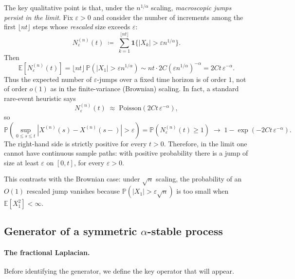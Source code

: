 \documentclass[11pt]{article}
\begin{document}
The key qualitative point is that, under the $n^{1/\alpha}$ scaling, \emph{macroscopic jumps persist in the limit}. Fix $\varepsilon>0$ and consider the number of increments among the first $\lfloor nt\rfloor$ steps whose \emph{rescaled} size exceeds $\varepsilon$:
\begin{equation}\label{eq:big_jumps_count}
N^{(n)}_{\varepsilon}(t)\;\coloneqq\;\sum_{k=1}^{\lfloor nt\rfloor}\mathbf 1\{|X_k|>\varepsilon n^{1/\alpha}\}.
\end{equation}
Then
\begin{equation}\label{eq:mean_big_jumps}
{\mathbb E}[N^{(n)}_{\varepsilon}(t)]
=
\lfloor nt\rfloor\,{\mathbb P}(|X_1|>\varepsilon n^{1/\alpha})
\sim
nt \cdot 2C (\varepsilon n^{1/\alpha})^{-\alpha}
=
2Ct\,\varepsilon^{-\alpha}.
\end{equation}
Thus the expected number of $\varepsilon$-jumps over a fixed time horizon is of order $1$, not of order $o(1)$ as in the finite-variance (Brownian) scaling. In fact, a standard rare-event heuristic says
\begin{equation}\label{eq:poisson_heuristic}
N^{(n)}_{\varepsilon}(t) \;\approx\; \mathrm{Poisson}(2Ct\,\varepsilon^{-\alpha}),
\end{equation}
so
\begin{equation}\label{eq:jump_probability}
{\mathbb P}\!\left(\sup_{0\le s\le t} |X^{(n)}(s)-X^{(n)}(s-)|>\varepsilon\right)
=
{\mathbb P}\!\left(N^{(n)}_{\varepsilon}(t)\ge 1\right)
\;\to\;
1-\exp(-2Ct\,\varepsilon^{-\alpha}).
\end{equation}
The right-hand side is strictly positive for every $t>0$. Therefore, in the limit one cannot have continuous sample paths: with positive probability there is a jump of size at least $\varepsilon$ on $[0,t]$, for every $\varepsilon>0$.

This contrasts with the Brownian case: under $\sqrt{n}$ scaling, the probability of an $O(1)$ rescaled jump vanishes because ${\mathbb P}(|X_1|>\varepsilon\sqrt{n})$ is too small when ${\mathbb E}[X_1^2]<\infty$.

\subsection{Generator of a symmetric $\alpha$-stable process}\label{subsec:stable_generator}

\paragraph{The fractional Laplacian.}
Before identifying the generator, we define the key operator that will appear.
\end{document}
